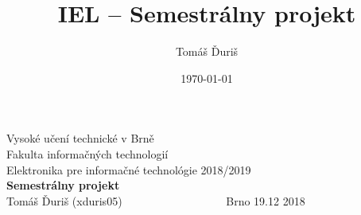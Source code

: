 \documentclass{article}
\title{IEL -- Semestrálny projekt}
\author{Tomáš Ďuriš}
\date{\today}
\begin{document}
	\begin{titlepage}
		\begin{center}	
			\Huge{Vysoké učení technické v Brně}\\
			\huge{Fakulta informačných technologií}\\
			\vspace{1cm}
			\huge{Elektronika pre informačné technológie}
			\vspace{3cm}
			\huge{2018/2019}\\
			\vspace{2cm}
			\huge{\textbf{Semestrálny projekt}}\\
			\vspace{12cm}
	    	\Large{Tomáš Ďuriš (xduris05)~~~~~~~~~~~~~~~~~~ Brno 19.12 2018}
		\end{center}	
	\end{titlepage}
\end{document}
